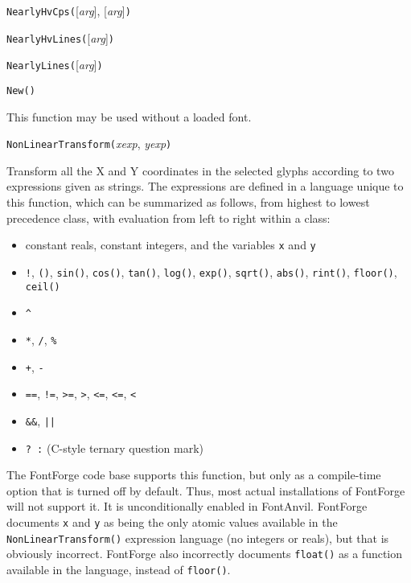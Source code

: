 
\texttt{NearlyHvCps(}[\textit{arg}], [\textit{arg}]\texttt{)}



\texttt{NearlyHvLines(}[\textit{arg}]\texttt{)}



\texttt{NearlyLines(}[\textit{arg}]\texttt{)}



\texttt{New(}\texttt{)}

This function may be used without a loaded font.



\texttt{NonLinearTransform(}\textit{xexp}, \textit{yexp}\texttt{)}

Transform all the X and Y coordinates in the selected glyphs according to
two expressions given as strings.  The expressions are defined in a language
unique to this function, which can be summarized as follows, from highest to
lowest precedence class, with evaluation from left to right within a class:
\begin{itemize}
  \item constant reals, constant integers, and the variables \texttt{x} and
    \texttt{y}
  \item \texttt{!}, \texttt{()}, \texttt{sin()}, \texttt{cos()},
    \texttt{tan()}, \texttt{log()}, \texttt{exp()}, \texttt{sqrt()},
    \texttt{abs()}, \texttt{rint()}, \texttt{floor()},
    \texttt{ceil()}
  \item \texttt{\textasciicircum}
  \item \texttt{*}, \texttt{/}, \texttt{\%}
  \item \texttt{+}, \texttt{-}
  \item \texttt{==}, \texttt{!=}, \texttt{>=}, \texttt{>}, \texttt{<=},
    \texttt{<=}, \texttt{<}
  \item \texttt{\&\&}, \texttt{||}
  \item \texttt{?~:} (C-style ternary question mark)
\end{itemize}

The FontForge \FFdiff code base supports this function, but only as a
compile-time option that is turned off by default.  Thus, most actual
installations of FontForge will not support it.  It is unconditionally
enabled in FontAnvil.  FontForge documents \texttt{x} and \texttt{y} as
being the only atomic values available in the \texttt{NonLinearTransform()}
expression language (no integers or reals), but that is obviously
incorrect.  FontForge also incorrectly documents \texttt{float()} as a
function available in the language, instead of \texttt{floor()}.

